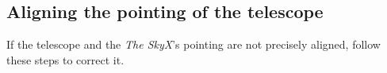 \documentclass[12pt,twoside,a4paper]{report}
\begin{document}

\subsection{Aligning the pointing of the telescope}
\label{pointing}


If the telescope and the \emph{The SkyX}'s pointing are not precisely aligned, follow these steps to correct it. 
\end{document}
